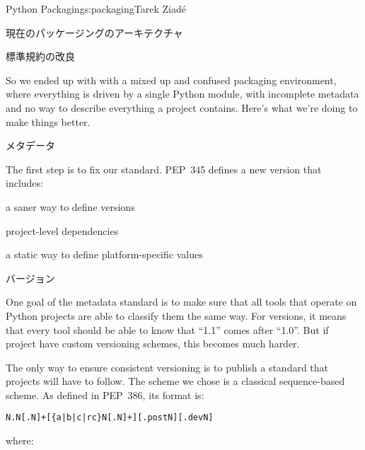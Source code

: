 \begin{aosachapter}{Python Packaging}{s:packaging}{Tarek Ziad\'{e}}
\begin{aosasect1}{現在のパッケージングのアーキテクチャ}
\end{aosasect1}

\begin{aosasect1}{標準規約の改良}

So we ended up with with a mixed up and confused packaging
environment, where everything is driven by a single Python module,
with incomplete metadata and no way to describe everything a project
contains.  Here's what we're doing to make things better.

\begin{aosasect2}{メタデータ}

The first step is to fix our  standard.  PEP~345
defines a new version that includes:

\begin{aosaitemize}

  \item a saner way to define versions

  \item project-level dependencies

  \item a static way to define platform-specific values

\end{aosaitemize}

\begin{aosasect3}{バージョン}

One goal of the metadata standard is to make sure that all tools that
operate on Python projects are able to classify them the same
way. For versions, it means that every tool should be able to know
that ``1.1'' comes after ``1.0''. But if project have custom
versioning schemes, this becomes much harder.

The only way to ensure consistent versioning is to publish a standard
that projects will have to follow.  The scheme we chose is a
classical sequence-based scheme.  As defined in PEP~386, its format
is:

\begin{verbatim}
N.N[.N]+[{a|b|c|rc}N[.N]+][.postN][.devN]
\end{verbatim}

\noindent where:

\begin{aosaitemize}


\end{aosaitemize}
\end{aosasect3}
\end{aosasect2}
\end{aosasect1}
\end{aosachapter}
